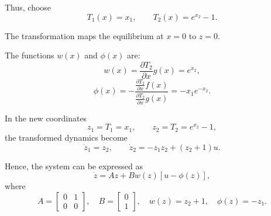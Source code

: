 \begin{example}
Thus, choose
\begin{equation}
T_1(x) = x_1, \qquad
T_2(x) = e^{x_2} - 1.
\end{equation}

The transformation maps the equilibrium at \( x = 0 \) to \( z = 0 \).

The functions \( w(x) \) and \( \phi(x) \) are:
\begin{equation}
w(x) = \frac{\partial T_2}{\partial x} g(x) = e^{x_2},
\end{equation}
\begin{equation}
\phi(x) = -\frac{\frac{\partial T_2}{\partial x} f(x)}{\frac{\partial T_2}{\partial x} g(x)} 
= -x_1 e^{-x_2}.
\end{equation}

In the new coordinates
\begin{equation}
z_1 = T_1 = x_1, \qquad 
z_2 = T_2 = e^{x_2} - 1,
\end{equation}
the transformed dynamics become
\begin{equation}
\dot{z}_1 = z_2, \qquad 
\dot{z}_2 = -z_1 z_2 + (z_2 + 1)u.
\end{equation}

Hence, the system can be expressed as
\begin{equation}
\dot{z} = A z + B w(z) [u - \phi(z)],
\end{equation}
where
\begin{equation}
A =
\begin{bmatrix}
0 & 1 \\ 0 & 0
\end{bmatrix}, \quad
B =
\begin{bmatrix}
0 \\ 1
\end{bmatrix}, \quad
w(z) = z_2 + 1, \quad
\phi(z) = -z_1.
\end{equation}
\end{example}


